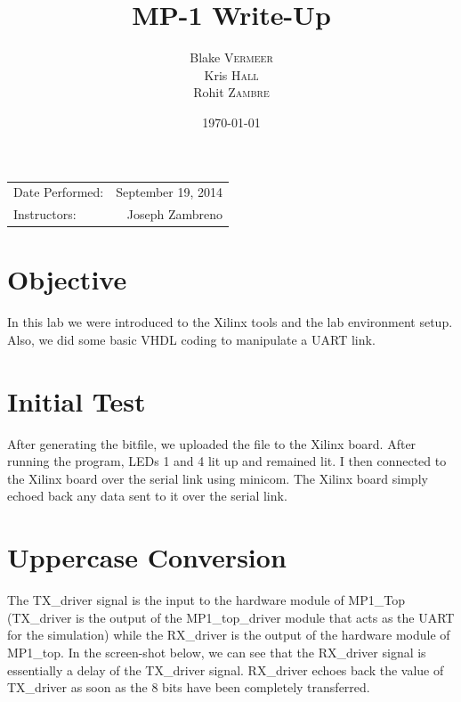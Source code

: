 \documentclass{article}
\title{MP-1 Write-Up} %
\author{Blake \textsc{Vermeer}\\
		Kris \textsc{Hall}\\
		Rohit \textsc{Zambre}} %
\date{\today} %
\begin{document}
\maketitle %

\begin{center}
\begin{tabular}{l r}
Date Performed: & September 19, 2014 \\ %
Instructors: & Joseph Zambreno %
\end{tabular}
\end{center}




\section{Objective}
In this lab we were introduced to the Xilinx tools and the lab environment setup. Also, we did some basic VHDL coding to manipulate a UART link.


\section{Initial Test}
After generating the bitfile, we uploaded the file to the Xilinx board. After running the program, LEDs 1 and 4 lit up and remained lit. I then connected to the Xilinx board over the serial link using minicom. The Xilinx board simply echoed back any data sent to it over the serial link. 


\section{Uppercase Conversion}
The TX\_driver signal is the input to the hardware module of MP1\_Top (TX\_driver is the output of the MP1\_top\_driver module that acts as the UART for the simulation) while the RX\_driver is the output of the hardware module of MP1\_top. In the screen-shot below, we can see that the RX\_driver signal is essentially a delay of the TX\_driver signal. RX\_driver echoes back the value of TX\_driver as soon as the 8 bits have been completely transferred.
\end{document}
